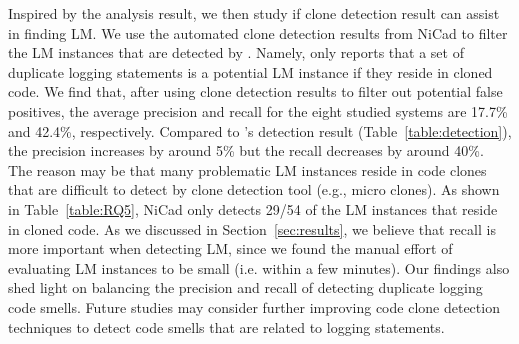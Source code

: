Inspired by the analysis result, we then study if clone detection result can assist \toolS in finding LM. We use the automated clone detection results from NiCad to filter the LM instances that are detected by \tool. Namely, \toolS only reports that a set of duplicate logging statements is a potential LM instance if they reside in cloned code. We find that, after using clone detection results to filter out potential false positives, the average precision and recall for the eight studied systems are 17.7\% and 42.4\%, respectively. Compared to \tool's detection result (Table~\ref{table:detection}), the precision increases by around 5\% but the recall decreases by around 40\%. The reason may be that many problematic LM instances reside in code clones that are difficult to detect by clone detection tool (e.g., micro clones). As shown in Table~\ref{table:RQ5}, NiCad only detects 29/54 of the LM instances that reside in cloned code. As we discussed in Section~\ref{sec:results}, we believe that recall is more important when detecting LM, since we found the manual effort of evaluating LM instances to be small (i.e. within a few minutes). Our findings also shed light on balancing the precision and recall of detecting duplicate logging code smells. Future studies may consider further improving code clone detection techniques to detect code smells that are related to logging statements. %








